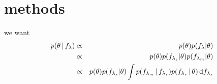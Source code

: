 \section{methods}

we want
\begin{align}
    p(\theta \,|\, f_\lambda) &\propto& p(\theta) p(f_\lambda | \theta) \\
     &\propto& p(\theta) p(f_{\lambda_s} | \theta) p(f_{\lambda_m} | \theta) \\
     &\propto& p(\theta) p(f_{\lambda_s} | \theta) \int p(f_{\lambda_m} \,|\,
     f_{\lambda_s}) p(f_{\lambda_s}\,|\,\theta)\,{\rm d}f_{\lambda_s} \\
\end{align} 
